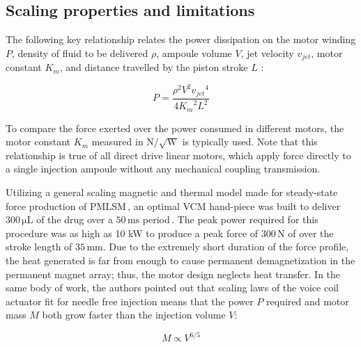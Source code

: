     
    \subsection{Scaling properties and limitations} \label{Chapter:background/voice coil motors for NFJI/scaling and limitation}
    
    
    The following key relationship relates the power dissipation on the motor winding $P$, density of fluid to be delivered $\rho$, ampoule volume $V$, jet velocity $v_{jet}$, motor constant $K_m$, and distance travelled by the piston stroke $L$ \cite{Williams2012}:
    
    
    \begin{equation}
        P=\frac{\rho^2 V^2 {v_{jet}}^4}{4 {K_m}^2 L^2}
        \label{eq:power required for F,V,v_jet,K_m, and L}
    \end{equation}
    
    
    To compare the force exerted over the power consumed in different motors, the motor constant $K_m$ measured in $\mathrm{N/\sqrt{W}}$  is typically used. Note that this relationship is true of all direct drive linear motors, which apply force directly to a single injection ampoule without any mechanical coupling transmission.
    
    
    Utilizing a general scaling magnetic and thermal model made for steady-state force production of \ac{PMLSM}\,\cite{Ruddy2011DesignMotors}, an optimal \acs{VCM} hand-piece was built to deliver $\mathrm{300\,\mu L}$ of the drug over a $\mathrm{50\,ms}$ period\,\cite{taberner2006}. The peak power required for this procedure was as high as 10 kW to produce a peak force of $\mathrm{300\,N}$ of over the stroke length of $\mathrm{35\,mm}$. Due to the extremely short duration of the force profile, the heat generated is far from enough to cause permanent demagnetization in the permanent magnet array; thus, the motor design neglects heat transfer. In the same body of work, the authors pointed out that scaling laws of the voice coil actuator fit for needle free injection means that the power $P$ required and motor mass $M$ both grow faster than the injection volume $V$:
    
    
    \begin{equation}
        M \propto V^{6/5}
        \label{eq:scaling property of VCM}
    \end{equation}


